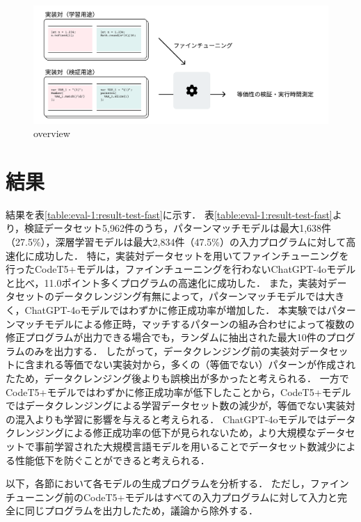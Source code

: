 \documentclass[11pt]{jreport}
\begin{document}
\begin{figure}[t]
\centerline{\includegraphics[width=0.8\linewidth]{Omori_fig/eval-1.pdf}}
\caption{overview}
\label{fig-dummy}
\end{figure}




\section{結果}\label{sec:result}


結果を表\ref{table:eval-1:result-test-fast}に示す．
表\ref{table:eval-1:result-test-fast}より，検証データセット5,962件のうち，パターンマッチモデルは最大1,638件（27.5\%），深層学習モデルは最大2,834件（47.5\%）の入力プログラムに対して高速化に成功した．
特に，実装対データセットを用いてファインチューニングを行ったCodeT5+モデルは，ファインチューニングを行わないChatGPT-4oモデルと比べ，11.0ポイント多くプログラムの高速化に成功した．
また，実装対データセットのデータクレンジング有無によって，パターンマッチモデルでは大きく，ChatGPT-4oモデルではわずかに修正成功率が増加した．
本実験ではパターンマッチモデルによる修正時，マッチするパターンの組み合わせによって複数の修正プログラムが出力できる場合でも，ランダムに抽出された最大10件のプログラムのみを出力する．
したがって，データクレンジング前の実装対データセットに含まれる等価でない実装対から，多くの（等価でない）パターンが作成されたため，データクレンジング後よりも誤検出が多かったと考えられる．
一方でCodeT5+モデルではわずかに修正成功率が低下したことから，CodeT5+モデルではデータクレンジングによる学習データセット数の減少が，等価でない実装対の混入よりも学習に影響を与えると考えられる．
ChatGPT-4oモデルではデータクレンジングによる修正成功率の低下が見られないため，より大規模なデータセットで事前学習された大規模言語モデルを用いることでデータセット数減少による性能低下を防ぐことができると考えられる．

以下，各節において各モデルの生成プログラムを分析する．
ただし，ファインチューニング前のCodeT5+モデルはすべての入力プログラムに対して入力と完全に同じプログラムを出力したため，議論から除外する．
\end{document}
